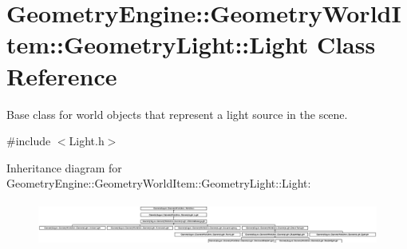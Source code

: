 \hypertarget{class_geometry_engine_1_1_geometry_world_item_1_1_geometry_light_1_1_light}{}\section{Geometry\+Engine\+::Geometry\+World\+Item\+::Geometry\+Light\+::Light Class Reference}
\label{class_geometry_engine_1_1_geometry_world_item_1_1_geometry_light_1_1_light}


Base class for world objects that represent a light source in the scene.  




{\ttfamily \#include $<$Light.\+h$>$}

Inheritance diagram for Geometry\+Engine\+::Geometry\+World\+Item\+::Geometry\+Light\+::Light\+:\begin{figure}[H]
\begin{center}
\leavevmode
\includegraphics[height=1.480176cm]{class_geometry_engine_1_1_geometry_world_item_1_1_geometry_light_1_1_light}
\end{center}
\end{figure}
